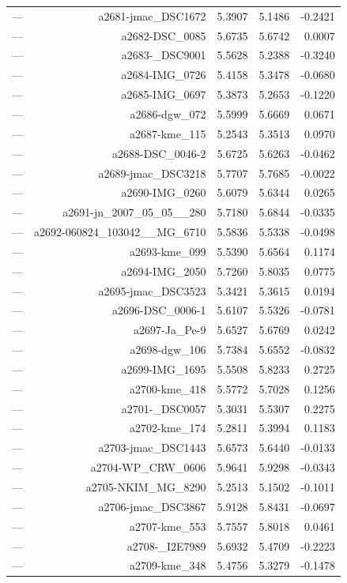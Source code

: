 \begin{table}[htbp]
\begin{tabular}{lrrrr}
— & a2681-jmac_DSC1672 & 5.3907 & 5.1486 & -0.2421 \\
— & a2682-DSC_0085 & 5.6735 & 5.6742 & 0.0007 \\
— & a2683-_DSC9001 & 5.5628 & 5.2388 & -0.3240 \\
— & a2684-IMG_0726 & 5.4158 & 5.3478 & -0.0680 \\
— & a2685-IMG_0697 & 5.3873 & 5.2653 & -0.1220 \\
— & a2686-dgw_072 & 5.5999 & 5.6669 & 0.0671 \\
— & a2687-kme_115 & 5.2543 & 5.3513 & 0.0970 \\
— & a2688-DSC_0046-2 & 5.6725 & 5.6263 & -0.0462 \\
— & a2689-jmac_DSC3218 & 5.7707 & 5.7685 & -0.0022 \\
— & a2690-IMG_0260 & 5.6079 & 5.6344 & 0.0265 \\
— & a2691-jn_2007_05_05__280 & 5.7180 & 5.6844 & -0.0335 \\
— & a2692-060824_103042__MG_6710 & 5.5836 & 5.5338 & -0.0498 \\
— & a2693-kme_099 & 5.5390 & 5.6564 & 0.1174 \\
— & a2694-IMG_2050 & 5.7260 & 5.8035 & 0.0775 \\
— & a2695-jmac_DSC3523 & 5.3421 & 5.3615 & 0.0194 \\
— & a2696-DSC_0006-1 & 5.6107 & 5.5326 & -0.0781 \\
— & a2697-Ja_Pe-9 & 5.6527 & 5.6769 & 0.0242 \\
— & a2698-dgw_106 & 5.7384 & 5.6552 & -0.0832 \\
— & a2699-IMG_1695 & 5.5508 & 5.8233 & 0.2725 \\
— & a2700-kme_418 & 5.5772 & 5.7028 & 0.1256 \\
— & a2701-_DSC0057 & 5.3031 & 5.5307 & 0.2275 \\
— & a2702-kme_174 & 5.2811 & 5.3994 & 0.1183 \\
— & a2703-jmac_DSC1443 & 5.6573 & 5.6440 & -0.0133 \\
— & a2704-WP_CRW_0606 & 5.9641 & 5.9298 & -0.0343 \\
— & a2705-NKIM_MG_8290 & 5.2513 & 5.1502 & -0.1011 \\
— & a2706-jmac_DSC3867 & 5.9128 & 5.8431 & -0.0697 \\
— & a2707-kme_553 & 5.7557 & 5.8018 & 0.0461 \\
— & a2708-_I2E7989 & 5.6932 & 5.4709 & -0.2223 \\
— & a2709-kme_348 & 5.4756 & 5.3279 & -0.1478 \\

\end{tabular}
\end{table}
